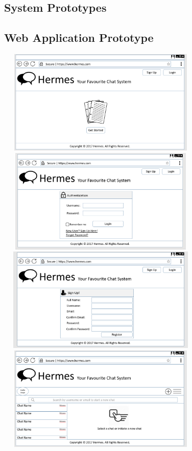 \documentclass{article}
\begin{document}
\newpage
\begin{appendices}
\appendix
\section{System Prototypes}
\subsection{Web Application Prototype}
\begin{center}
\includegraphics[width=10cm, height=5cm]{w1}
\includegraphics[width=10cm, height=5cm]{w2}
\includegraphics[width=10cm, height=5cm]{w3}
\includegraphics[width=10cm, height=5cm]{w4}

\end{center}
\end{appendices}
\end{document}
